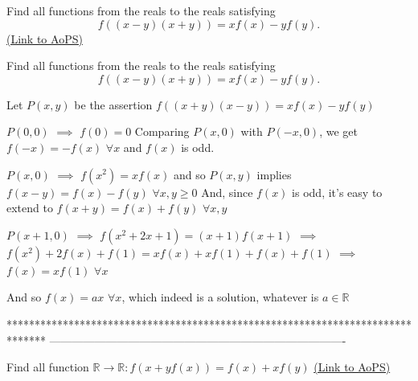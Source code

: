 \begin{problem}
	Find all functions from the reals to the reals satisfying \[f((x-y)(x+y))=xf(x)-yf(y).\]
	\flushright \href{https://artofproblemsolving.com/community/c6h563126}{(Link to AoPS)}
\end{problem}



\begin{solution}
	\begin{tcolorbox}Find all functions from the reals to the reals satisfying \[f((x-y)(x+y))=xf(x)-yf(y).\]\end{tcolorbox}
Let $P(x,y)$ be the assertion $f((x+y)(x-y))=xf(x)-yf(y)$

$P(0,0)$ $\implies$ $f(0)=0$
Comparing $P(x,0)$ with $P(-x,0)$, we get $f(-x)=-f(x)$ $\forall x$ and $f(x)$ is odd.

$P(x,0)$ $\implies$ $f(x^2)=xf(x)$ and so $P(x,y)$ implies $f(x-y)=f(x)-f(y)$ $\forall x,y\ge 0$
And, since $f(x)$ is odd, it's easy to extend to $f(x+y)=f(x)+f(y)$ $\forall x,y$

$P(x+1,0)$ $\implies$  $f(x^2+2x+1)=(x+1)f(x+1)$ $\implies$ $f(x^2)+2f(x)+f(1)=xf(x)+xf(1)+f(x)+f(1)$ $\implies$ $f(x)=xf(1)$ $\forall x$

And so $\boxed{f(x)=ax}$ $\forall x$, which indeed is a solution, whatever is $a\in\mathbb R$
\end{solution}
*******************************************************************************
-------------------------------------------------------------------------------

\begin{problem}
	Find all function $\mathbb{R} \rightarrow \mathbb{R}: f(x+yf(x)) = f(x) +x f(y)$
	\flushright \href{https://artofproblemsolving.com/community/c6h563153}{(Link to AoPS)}
\end{problem}



